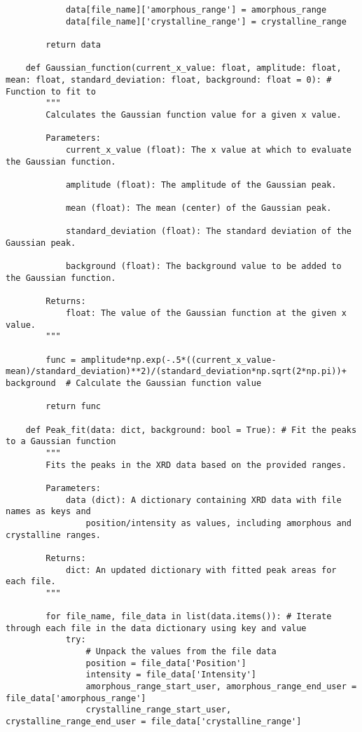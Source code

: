 \begin{lstlisting}
            data[file_name]['amorphous_range'] = amorphous_range
            data[file_name]['crystalline_range'] = crystalline_range

        return data

    def Gaussian_function(current_x_value: float, amplitude: float, mean: float, standard_deviation: float, background: float = 0): # Function to fit to
        """
        Calculates the Gaussian function value for a given x value.

        Parameters:
            current_x_value (float): The x value at which to evaluate the Gaussian function.

            amplitude (float): The amplitude of the Gaussian peak.

            mean (float): The mean (center) of the Gaussian peak.

            standard_deviation (float): The standard deviation of the Gaussian peak.

            background (float): The background value to be added to the Gaussian function.

        Returns:
            float: The value of the Gaussian function at the given x value.
        """

        func = amplitude*np.exp(-.5*((current_x_value-mean)/standard_deviation)**2)/(standard_deviation*np.sqrt(2*np.pi))+ background  # Calculate the Gaussian function value

        return func

    def Peak_fit(data: dict, background: bool = True): # Fit the peaks to a Gaussian function
        """
        Fits the peaks in the XRD data based on the provided ranges.

        Parameters:
            data (dict): A dictionary containing XRD data with file names as keys and 
                position/intensity as values, including amorphous and crystalline ranges.

        Returns:
            dict: An updated dictionary with fitted peak areas for each file.
        """

        for file_name, file_data in list(data.items()): # Iterate through each file in the data dictionary using key and value
            try:
                # Unpack the values from the file data
                position = file_data['Position']
                intensity = file_data['Intensity']
                amorphous_range_start_user, amorphous_range_end_user = file_data['amorphous_range']
                crystalline_range_start_user, crystalline_range_end_user = file_data['crystalline_range']


\end{lstlisting}
